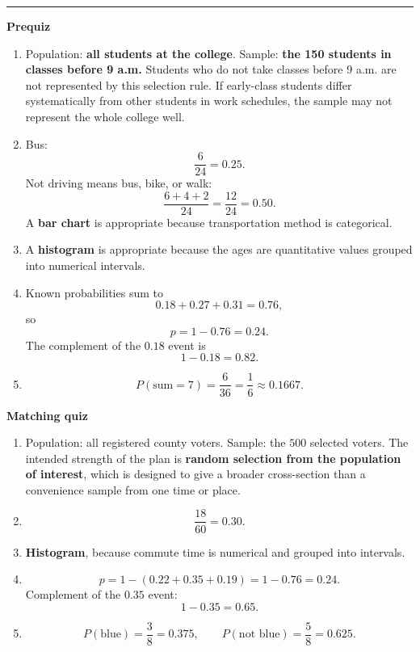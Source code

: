\documentclass[10pt]{article}
\newcommand{\modulekey}[2]{\clearpage{\Large\bfseries\textcolor{olive}{Module #1: #2 — Answer Key}}\par\textcolor{gold}{\rule{\linewidth}{1.2pt}}\par}
\begin{document}
\modulekey{2}{Frequency, Probability, and Distributions}
\textbf{Prequiz}
\begin{enumerate}
\item Population: \textbf{all students at the college}. Sample: \textbf{the 150 students in classes before 9 a.m.} Students who do not take classes before 9 a.m. are not represented by this selection rule. If early-class students differ systematically from other students in work schedules, the sample may not represent the whole college well.
\item Bus:
\[
\frac6{24}=\boxed{0.25}.
\]
Not driving means bus, bike, or walk:
\[
\frac{6+4+2}{24}=\frac{12}{24}=\boxed{0.50}.
\]
A \textbf{bar chart} is appropriate because transportation method is categorical.
\item A \textbf{histogram} is appropriate because the ages are quantitative values grouped into numerical intervals.
\item Known probabilities sum to
\[
0.18+0.27+0.31=0.76,
\]
so
\[
p=1-0.76=\boxed{0.24}.
\]
The complement of the \(0.18\) event is
\[
1-0.18=\boxed{0.82}.
\]
\item
\[
P(\text{sum}=7)=\frac6{36}=\frac16\approx\boxed{0.1667}.
\]
\end{enumerate}

\textbf{Matching quiz}
\begin{enumerate}
\item Population: all registered county voters. Sample: the \(500\) selected voters. The intended strength of the plan is \textbf{random selection from the population of interest}, which is designed to give a broader cross-section than a convenience sample from one time or place.
\item
\[
\frac{18}{60}=\boxed{0.30}.
\]
\item \textbf{Histogram}, because commute time is numerical and grouped into intervals.
\item
\[
p=1-(0.22+0.35+0.19)=1-0.76=\boxed{0.24}.
\]
Complement of the \(0.35\) event:
\[
1-0.35=\boxed{0.65}.
\]
\item
\[
P(\text{blue})=\frac38=\boxed{0.375},\qquad P(\text{not blue})=\frac58=\boxed{0.625}.
\]
\end{enumerate}
\end{document}
